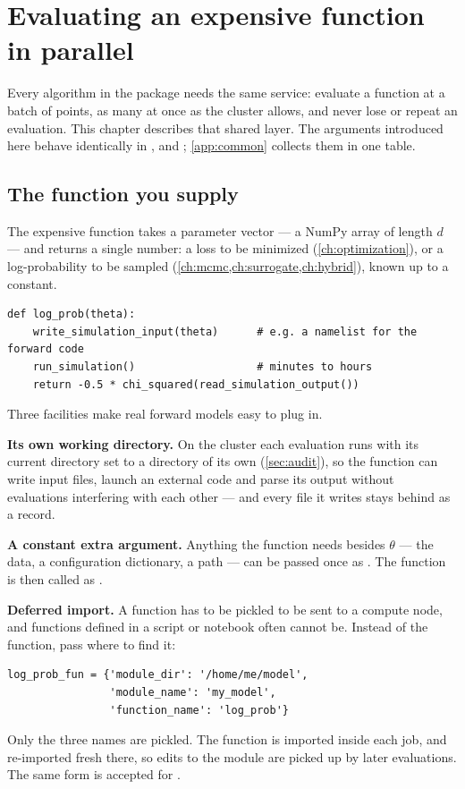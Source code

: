 \chapter{Evaluating an expensive function in parallel}
\label{ch:parallel}

Every algorithm in the package needs the same service: evaluate a function at a batch of points,
as many at once as the cluster allows, and never lose or repeat an evaluation. This chapter
describes that shared layer. The arguments introduced here behave identically in
,  and ; \cref{app:common} collects
them in one table.

\section{The function you supply}

The expensive function takes a parameter vector --- a NumPy array of length $d$ --- and returns a
single number: a loss to be minimized (\cref{ch:optimization}), or a log-probability to be sampled
(\cref{ch:mcmc,ch:surrogate,ch:hybrid}), known up to a constant.

\begin{lstlisting}
def log_prob(theta):
    write_simulation_input(theta)      # e.g. a namelist for the forward code
    run_simulation()                   # minutes to hours
    return -0.5 * chi_squared(read_simulation_output())
\end{lstlisting}

Three facilities make real forward models easy to plug in.

\textbf{Its own working directory.} On the cluster each evaluation runs with its current directory
set to a directory of its own (\cref{sec:audit}), so the function can write input files, launch an
external code and parse its output without evaluations interfering with each other --- and every
file it writes stays behind as a record.

\textbf{A constant extra argument.} Anything the function needs besides $\theta$ --- the data, a
configuration dictionary, a path --- can be passed once as . The function is then
called as .

\textbf{Deferred import.} A function has to be pickled to be sent to a compute node, and functions
defined in a script or notebook often cannot be. Instead of the function, pass where to find it:
\begin{lstlisting}
log_prob_fun = {'module_dir': '/home/me/model',
                'module_name': 'my_model',
                'function_name': 'log_prob'}
\end{lstlisting}
Only the three names are pickled. The function is imported inside each job, and re-imported fresh
there, so edits to the module are picked up by later evaluations. The same form is accepted for
.

